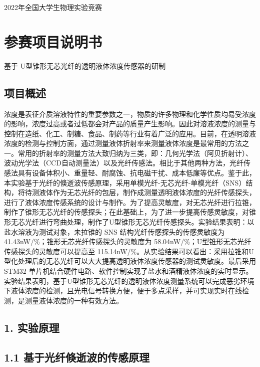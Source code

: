 \documentclass[
  10
]{article}
\author{}
\date{}
\begin{document}
2022年全国大学生物理实验竞赛

\section{参赛项目说明书}\label{ux53c2ux8d5bux9879ux76eeux8bf4ux660eux4e66}

基于 U型锥形无芯光纤的透明液体浓度传感器的研制

\subsection{项目概述}\label{ux9879ux76eeux6982ux8ff0}

浓度是表征介质溶液特性的重要参数之一，物质的许多物理和化学性质均易受浓度的影响，浓度过高或者过低都会对产品的质量产生影响。因此对溶液浓度的测量与控制在造纸、化工、制糖、食品、制药等行业有着广泛的应用。目前，在透明溶液浓度的检测与控制方面，通过测量液体折射率来测量液体浓度是最常用的方法之一。常用的折射率的测量方法大致归纳为三类，即：几何光学法（阿贝折射计）、波动光学法（CCD自动测量法）以及光纤传感法。相比于其他两种方法，光纤传感法具有设备体积小、重量轻、耐腐蚀、抗电磁干扰、成本低廉等优点。鉴于此，本实验基于光纤的倏逝波传感原理，采用单模光纤-无芯光纤-单模光纤（SNS）结构，将待测液体作为无芯光纤的包层，制作成测量透明液体浓度的光纤传感探头，进行了液体浓度传感系统的设计与制作。为了提高灵敏度，对无芯光纤进行拉锥，制作了锥形无芯光纤的传感探头；在此基础上，为了进一步提高传感灵敏度，对锥形无芯光纤进行弯曲处理，制作了U型锥形无芯光纤传感探头。实验结果表明：以盐水溶液为测试对象，未拉锥的
SNS 结构光纤传感探头的传感灵敏度为
41.43nW/\%；锥形无芯光纤传感探头的灵敏度为
58.04nW/\%；U型锥形无芯光纤传感探头的灵敏度可以提高至
115.14nW/\%。从实验结果可以看出：采用拉锥和U型化处理后的无芯光纤可以大大提高透明液体浓度传感器的测试灵敏度。最后采用
STM32
单片机结合硬件电路、软件控制实现了盐水和酒精液体浓度的实时显示。实验结果表明，基于U型锥形无芯光纤的透明液体浓度测量系统可以完成恶劣环境下液体浓度的检测，且光电信号转换方便，便于多点采样，并可实现实时在线检测，是测量液体浓度的一种有效方法。

\subsection{1. 实验原理}\label{ux5b9eux9a8cux539fux7406}

\subsection{1.1
基于光纤倏逝波的传感原理}\label{ux57faux4e8eux5149ux7ea4ux500fux901dux6ce2ux7684ux4f20ux611fux539fux7406}
\end{document}
